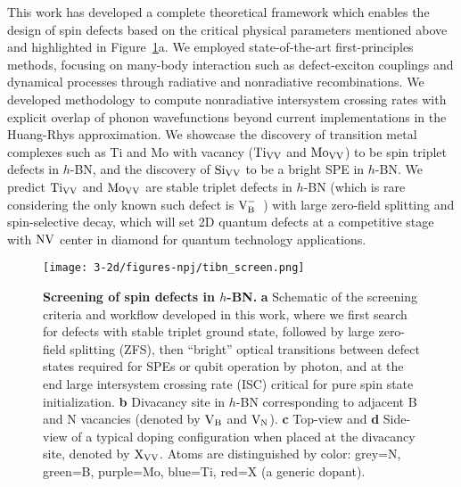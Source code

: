 This work has developed a complete theoretical framework which enables the design of spin defects based on the critical physical parameters mentioned above and highlighted in Figure~\ref{fig:screen}a. We employed state-of-the-art first-principles methods, focusing on many-body interaction such as defect-exciton couplings and dynamical processes through radiative and nonradiative recombinations. We developed methodology to compute nonradiative intersystem crossing rates with explicit overlap of phonon wavefunctions beyond current implementations in the Huang-Rhys approximation\cite{thiering2017ab}. We showcase the discovery of transition metal complexes such as Ti and Mo with vacancy ($\text{Ti}_{\text{V}\text{V}}$ and $\text{Mo}_{\text{V}\text{V}}$) to be spin triplet defects in $h$-BN, and the discovery of $\text{Si}_{\text{V}\text{V}}$ to be a bright SPE in $h$-BN.
We predict $\text{Ti}_{\text{V}\text{V}}$ and $\text{Mo}_{\text{V}\text{V}}$ are stable triplet defects in $h$-BN (which is rare considering the only known such defect is $\text{V}_\text{B}^-$~\cite{gottscholl2020initialization}) with large zero-field splitting and spin-selective decay, which will set 2D quantum defects at a competitive stage with $\text{NV}$ center in diamond for quantum technology applications.

\begin{figure}[H]
    \centering
    \texttt{[image: 3-2d/figures-npj/tibn\_screen.png]}
    \caption{\textbf{Screening of spin defects in $h$-BN.} \textbf{a} Schematic of the screening criteria and workflow developed in this work, where we first search for defects with stable triplet ground state, followed by large zero-field splitting (ZFS), then ``bright'' optical transitions between defect states required for SPEs or qubit operation by photon, and at the end large intersystem crossing rate (ISC) critical for pure spin state initialization. \textbf{b} Divacancy site in $h$-BN corresponding to adjacent B and N vacancies (denoted by $\text{V}_\text{B}$ and $\text{V}_\text{N}$). \textbf{c} Top-view and \textbf{d} Side-view of a typical doping configuration when placed at the divacancy site, denoted by $\text{X}_{\text{V}\text{V}}$. Atoms are distinguished by color: grey=N, green=B, purple=Mo, blue=Ti, red=X (a generic dopant).}
    \label{fig:screen}
\end{figure}


